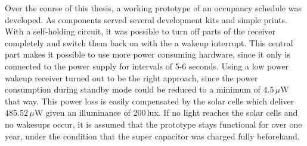 Over the course of this thesis, a working prototype of an occupancy schedule was developed.
As components served several development kits and simple prints.
With a self-holding circuit, it was possible to turn off parts of the receiver completely and switch them back on with the a wakeup interrupt.
This central part makes it possible to use more power consuming hardware, since it only is connected to the power supply for intervals of 5-6 seconds.
Using a low power wakeup receiver turned out to be the right approach, since the power consumption during standby mode could be reduced to a minimum of $4.5\,\mu\text{W}$ that way.
This power loss is easily compensated by the solar cells which deliver $485.52\,\mu\text{W}$ given an illuminance of 200\,lux.
If no light reaches the solar cells and no wakesups occur, it is assumed that the prototype stays functional for over one year, under the condition that the super capacitor was charged fully beforehand.

